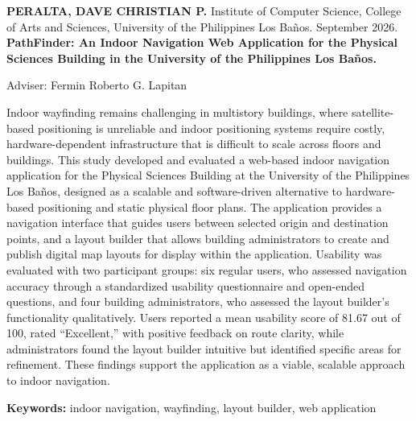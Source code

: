 
{\singlespacing\noindent
\textbf{PERALTA, DAVE CHRISTIAN P.} Institute of Computer Science, College of
Arts and Sciences, University of the Philippines Los Baños. September 2026.
\textbf{PathFinder: An Indoor Navigation Web Application for the Physical
Sciences Building in the University of the Philippines Los Baños.}\par}

{\singlespacing\noindent
Adviser: Fermin Roberto G. Lapitan\par}

Indoor wayfinding remains challenging in multistory buildings, where
satellite-based positioning is unreliable and indoor positioning systems require
costly, hardware-dependent infrastructure that is difficult to scale across
floors and buildings. This study developed and evaluated a web-based indoor
navigation application for the Physical Sciences Building at the University of
the Philippines Los Baños, designed as a scalable and software-driven
alternative to hardware-based positioning and static physical floor plans. The
application provides a navigation interface that guides users between selected
origin and destination points, and a layout builder that allows building
administrators to create and publish digital map layouts for display within the
application. Usability was evaluated with two participant groups: six regular
users, who assessed navigation accuracy through a standardized usability
questionnaire and open-ended questions, and four building administrators, who
assessed the layout builder's functionality qualitatively. Users reported a mean
usability score of 81.67 out of 100, rated ``Excellent,'' with positive feedback
on route clarity, while administrators found the layout builder intuitive but
identified specific areas for refinement. These findings support the application
as a viable, scalable approach to indoor navigation.

\noindent
\textbf{Keywords:} indoor navigation, wayfinding, layout builder, web
application
